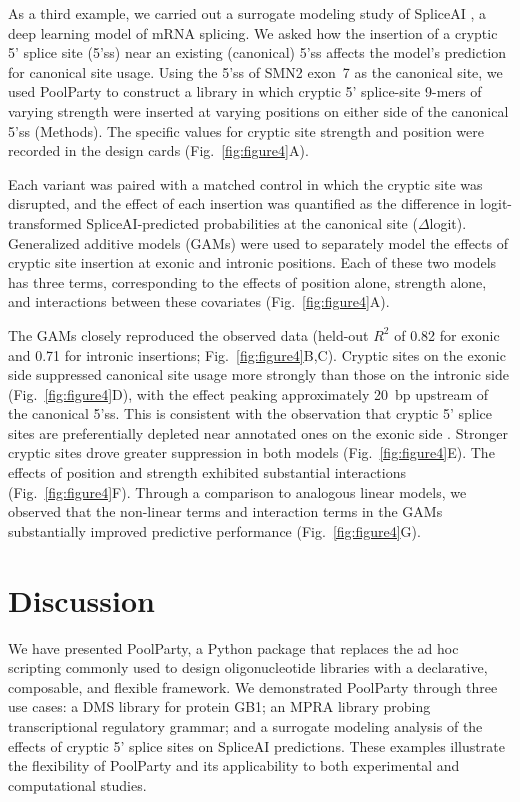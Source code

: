 \documentclass[twoside]{kinneylab_preprintstyle}
\begin{document}
As a third example, we carried out a surrogate modeling study of SpliceAI \citep{Jaganathan2019ps}, a deep learning model of mRNA splicing. We asked how the insertion of a cryptic 5' splice site (5'ss) near an existing (canonical) 5'ss affects the model's prediction for canonical site usage. Using the 5'ss of SMN2 exon~7 as the canonical site, we used PoolParty to construct a library in which cryptic 5' splice-site 9-mers of varying strength were inserted at varying positions on either side of the canonical 5'ss (Methods). The specific values for cryptic site strength and position were recorded in the design cards (Fig.~\ref{fig:figure4}A).

Each variant was paired with a matched control in which the cryptic site was disrupted, and the effect of each insertion was quantified as the difference in logit-transformed SpliceAI-predicted probabilities at the canonical site ($\Delta$logit). Generalized additive models (GAMs) were used to separately model the effects of cryptic site insertion at exonic and intronic positions. Each of these two models has three terms, corresponding to the effects of position alone, strength alone, and interactions between these covariates (Fig.~\ref{fig:figure4}A).

The GAMs closely reproduced the observed data (held-out $R^2$ of 0.82 for exonic and 0.71 for intronic insertions; Fig.~\ref{fig:figure4}B,C). Cryptic sites on the exonic side suppressed canonical site usage more strongly than those on the intronic side (Fig.~\ref{fig:figure4}D), with the effect peaking approximately 20~bp upstream of the canonical 5'ss. This is consistent with the observation that cryptic 5' splice sites are preferentially depleted near annotated ones on the exonic side \citep{Dawes2022empirical}. Stronger cryptic sites drove greater suppression in both models (Fig.~\ref{fig:figure4}E). The effects of position and strength exhibited substantial interactions (Fig.~\ref{fig:figure4}F). Through a comparison to analogous linear models, we observed that the non-linear terms and interaction terms in the GAMs substantially improved predictive performance (Fig.~\ref{fig:figure4}G).

\section*{Discussion}

We have presented PoolParty, a Python package that replaces the ad hoc scripting commonly used to design oligonucleotide libraries with a declarative, composable, and flexible framework. We demonstrated PoolParty through three use cases: a DMS library for protein GB1; an MPRA library probing transcriptional regulatory grammar; and a surrogate modeling analysis of the effects of cryptic 5' splice sites on SpliceAI predictions. These examples illustrate the flexibility of PoolParty and its applicability to both experimental and computational studies.
\end{document}

